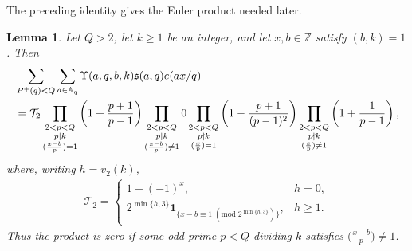 \documentclass[12pt,reqno]{amsart}
\numberwithin{equation}{section}
\newtheorem{lemma}[equation]{Lemma}
\theoremstyle{definition}
\theoremstyle{remark}
\begin{document}
The preceding identity gives the Euler product needed later. 



\begin{lemma}\label{l:motamakemajorprimesquareprog}
Let $Q>2$, let $k\geq1$ be an integer, and let
$x,b\in\mathbb Z$ satisfy $(b,k)=1$.
Then
\begin{align}\label{e:corupss}
 &\sum_{P^+(q)<Q}\sum_{a\in\mathbb A_q}
 \Upsilon(a,q,b,k)\mathfrak s(a,q)e(ax/q)\notag\\
 &=\mathcal T_2
 \prod_{\substack{2<p<Q\\p\mid k\\(\frac{x-b}{p})=1}}
 \left(1+\frac{p+1}{p-1}\right)
 \prod_{\substack{2<p<Q\\p\mid k\\(\frac{x-b}{p})\ne1}}0 
 \prod_{\substack{2<p<Q\\p\nmid k\\(\frac{x}{p})=1}}
 \left(1-\frac{p+1}{(p-1)^2}\right)
 \prod_{\substack{2<p<Q\\p\nmid k\\(\frac{x}{p})\ne1}}
 \left(1+\frac1{p-1}\right),
\end{align}
where, writing \(h=v_2(k)\),
\begin{align}\label{e:T2factor}
 \mathcal T_2=
 \begin{cases}
  1+(-1)^x,&h=0,\\
  2^{\min\{h,3\}}
  \mathbf1_{\{x-b\equiv1\;(\mathrm{mod}\;2^{\min\{h,3\}})\}},
  &h\geq1.
 \end{cases}
\end{align}
Thus the product is zero if some odd prime $p<Q$ dividing $k$
satisfies $\bigl(\frac{x-b}{p}\bigr)\ne1$.
\end{lemma}
\end{document}
